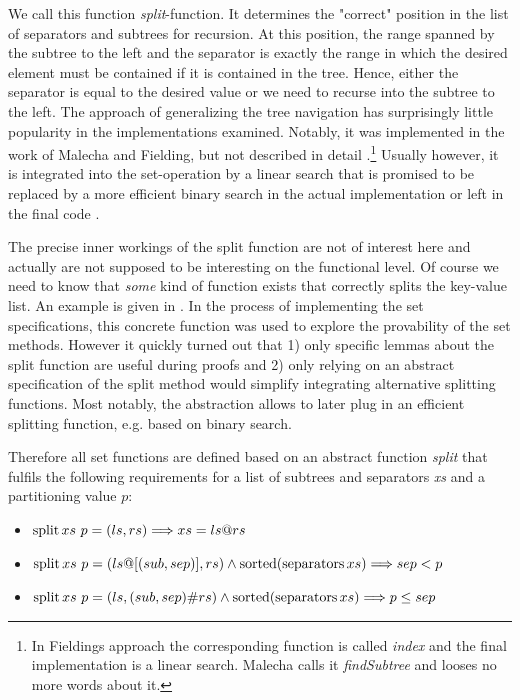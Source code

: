 We call this function \textit{split}-function.
It determines the "correct" position in the list of separators and subtrees
for recursion.
At this position, the range spanned by the subtree to the left
and the separator is exactly the range in which the desired element
must be contained if it is contained in the tree.
Hence, either the separator is equal to the desired value or
we need to recurse into the subtree to the left.
The approach of generalizing the tree navigation has
surprisingly little popularity in the implementations examined.
Notably, it was implemented in the work of Malecha and Fielding,
but not described in detail \parencite{DBLP:conf/popl/MalechaMSW10,Fielding80}.\footnote{
    In Fieldings approach the corresponding function is called \textit{index} and the final implementation is a linear search.
    Malecha calls it \textit{findSubtree} and looses no more words about it.
}
Usually however, it is integrated into the set-operation
by a linear search that is promised to be replaced by a more efficient binary search
in the actual implementation \parencite{DBLP:books/daglib/0023376,DBLP:journals/acta/BayerM72}
or left in the final code \parencite{DBLP:journals/sosym/ErnstSR15}.

The precise inner workings of the split function are not of interest here
and actually are not supposed to be interesting on the functional level.
Of course we need to know that \textit{some} kind of function
exists that correctly splits the key-value list.
An example is given in .
In the process of implementing the set specifications,
this concrete function was used to explore the provability of the set methods.
However it quickly turned out that 1) only specific lemmas about the split
function are useful during proofs and 2) only relying on an abstract specification of
the split method would simplify integrating alternative splitting functions.
Most notably, the abstraction allows to later plug in an efficient splitting
function, e.g. based on binary search.


\begin{samepage}
Therefore all set functions are defined based on an abstract function
\textit{split} that fulfils the following requirements for a list of subtrees
and separators \textit{xs} and a partitioning value $p$:

\begin{itemize}
    \item $\operatorname{split} xs\ p = (ls,rs) \Longrightarrow xs = ls @ rs$
    \item $\operatorname{split} xs\ p = (ls@[(sub,sep)],rs) \wedge \operatorname{sorted} (\operatorname{separators} xs) \Longrightarrow sep < p$
    \item $\operatorname{split} xs\ p = (ls,(sub,sep)\#rs) \wedge \operatorname{sorted} (\operatorname{separators} xs) \Longrightarrow p \le sep$
\end{itemize}
\end{samepage}

